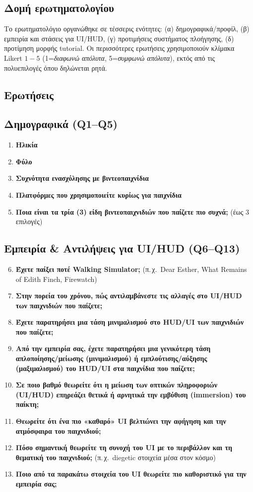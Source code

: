\subsection{Δομή ερωτηματολογίου}
Το ερωτηματολόγιο οργανώθηκε σε τέσσερις ενότητες: (α) δημογραφικά/προφίλ, (β) εμπειρία και στάσεις για UI/HUD, (γ) προτιμήσεις συστήματος πλοήγησης, (δ) προτίμηση μορφής tutorial. Οι περισσότερες ερωτήσεις χρησιμοποιούν κλίμακα Likert \(1\!-\!5\) (1=\textit{διαφωνώ απόλυτα}, 5=\textit{συμφωνώ απόλυτα}), εκτός από τις πολυεπιλογές όπου δηλώνεται ρητά.

\subsection{Ερωτήσεις}
\subsection*{Δημογραφικά (Q1–Q5)}
\begin{enumerate}
  \item \textbf{Ηλικία}
  \item \textbf{Φύλο}
  \item \textbf{Συχνότητα ενασχόλησης με βιντεοπαιχνίδια}
  \item \textbf{Πλατφόρμες που χρησιμοποιείτε κυρίως για παιχνίδια}
  \item \textbf{Ποια είναι τα τρία (3) είδη βιντεοπαιχνιδιών που παίζετε πιο συχνά;} (έως 3 επιλογές)
\end{enumerate}

\subsection*{Εμπειρία \& Αντιλήψεις για UI/HUD (Q6–Q13)}
\begin{enumerate}\setcounter{enumi}{5}
  \item \textbf{Έχετε παίξει ποτέ Walking Simulator;} (π.\,χ.\ Dear Esther, What Remains of Edith Finch, Firewatch)
  \item \textbf{Στην πορεία του χρόνου, πώς αντιλαμβάνεστε τις αλλαγές στο UI/HUD των παιχνιδιών που παίζετε;}
  \item \textbf{Έχετε παρατηρήσει μια τάση μινιμαλισμού στο HUD/UI των παιχνιδιών που παίζετε;}
  \item \textbf{Από την εμπειρία σας, έχετε παρατηρήσει μια γενικότερη τάση απλοποίησης/μείωσης (μινιμαλισμού) ή εμπλούτισης/αύξησης (μαξιμαλισμού) του HUD/UI στα παιχνίδια που παίζετε;}
  \item \textbf{Σε ποιο βαθμό θεωρείτε ότι η μείωση των οπτικών πληροφοριών (UI/HUD) επηρεάζει θετικά ή αρνητικά την εμβύθιση (immersion) του παίκτη;}
  \item \textbf{Θεωρείτε ότι ένα πιο «καθαρό» UI βελτιώνει την αφήγηση και την ατμόσφαιρα του παιχνιδιού;}
  \item \textbf{Πόσο σημαντική θεωρείτε τη συνοχή του UI με το περιβάλλον και τη θεματική του παιχνιδιού;} (π.\,χ.\ diegetic στοιχεία μέσα στον κόσμο)
  \item \textbf{Ποιο από τα παρακάτω στοιχεία του UI θεωρείτε πιο καθοριστικό για την εμπειρία σας;}
\end{enumerate}

